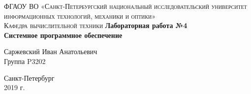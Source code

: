 \begin{titlepage}
\begin{center}

\textsc{ФГАОУ ВО «Санкт-Петербургский национальный исследовательский университет информационных технологий, механики и оптики»\\[4mm]
Кафедра вычислительной техники}
\vfill
\textbf{Лабораторная работа №4\\[4mm]
Системное программное обеспечение\\[16mm]
}
\begin{flushright}
Саржевский Иван Анатольевич
\\[2mm]Группа P3202
\end{flushright}
\vfill
Санкт-Петербург\\[2mm]
2019 г.

\end{center}
\end{titlepage}
